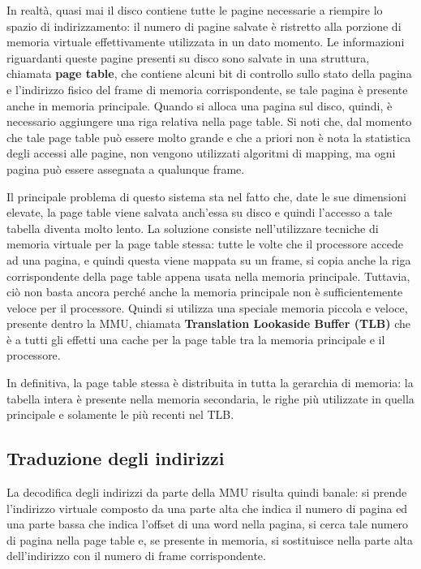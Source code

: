 \documentclass[11pt,4paper]{report}
\begin{document}
In realtà, quasi mai il disco contiene tutte le pagine necessarie a riempire lo spazio di indirizzamento: il numero di pagine salvate è ristretto alla porzione di memoria virtuale effettivamente utilizzata in un dato momento. Le informazioni riguardanti queste pagine presenti su disco sono salvate in una struttura, chiamata \textbf{page table}, che contiene alcuni bit di controllo sullo stato della pagina e l'indirizzo fisico del frame di memoria corrispondente, se tale pagina è presente anche in memoria principale. Quando si alloca una pagina sul disco, quindi, è necessario aggiungere una riga relativa nella page table. Si noti che, dal momento che tale page table può essere molto grande e che a priori non è nota la statistica degli accessi alle pagine, non vengono utilizzati algoritmi di mapping, ma ogni pagina può essere assegnata a qualunque frame.

Il principale problema di questo sistema sta nel fatto che, date le sue dimensioni elevate, la page table viene salvata anch'essa su disco e quindi l'accesso a tale tabella diventa molto lento. La soluzione consiste nell'utilizzare tecniche di memoria virtuale per la page table stessa: tutte le volte che il processore accede ad una pagina, e quindi questa viene mappata su un frame, si copia anche la riga corrispondente della page table appena usata nella memoria principale. Tuttavia, ciò non basta ancora perché anche la memoria principale non è sufficientemente veloce per il processore. Quindi si utilizza una speciale memoria piccola e veloce, presente dentro la MMU, chiamata \textbf{Translation Lookaside Buffer (TLB)} che è a tutti gli effetti una cache per la page table tra la memoria principale e il processore.

In definitiva, la page table stessa è distribuita in tutta la gerarchia di memoria: la tabella intera è presente nella memoria secondaria, le righe più utilizzate in quella principale e solamente le più recenti nel TLB.

\subsection{Traduzione degli indirizzi}
La decodifica degli indirizzi da parte della MMU risulta quindi banale: si prende l'indirizzo virtuale composto da una parte alta che indica il numero di pagina ed una parte bassa che indica l'offset di una word nella pagina, si cerca tale numero di pagina nella page table e, se presente in memoria, si sostituisce nella parte alta dell'indirizzo con il numero di frame corrispondente.
\end{document}
